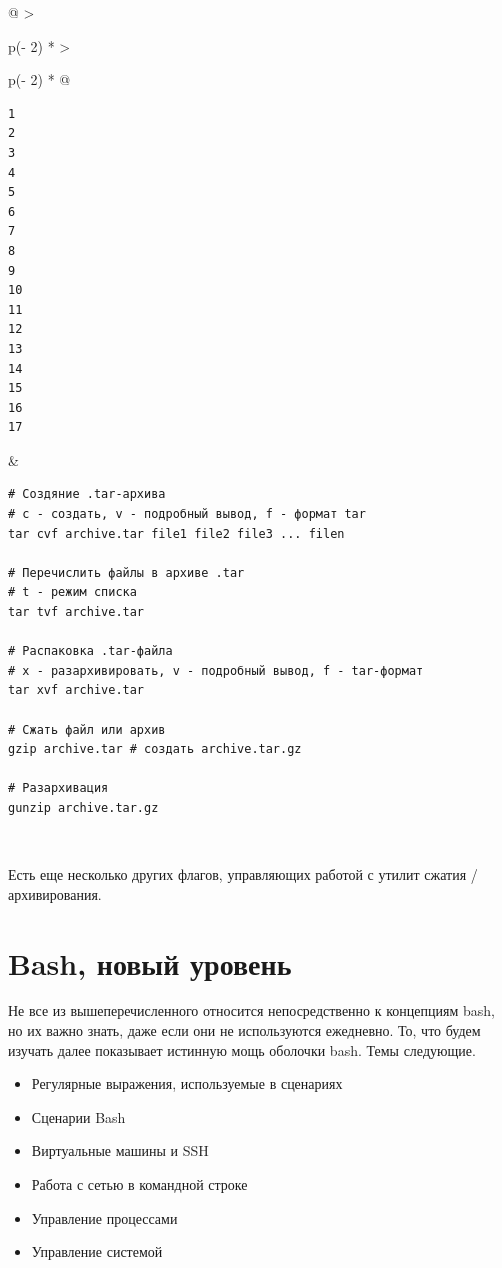 \documentclass{report}
\begin{document}
\begin{longtable}[]{@{}
  >{\raggedright\arraybackslash}p{(\columnwidth - 2\tabcolsep) * }
  >{\raggedright\arraybackslash}p{(\columnwidth - 2\tabcolsep) * }@{}}
\toprule
\endhead
\begin{minipage}[t]{\linewidth}\raggedright
\begin{verbatim}
1
2
3
4
5
6
7
8
9
10
11
12
13
14
15
16
17
\end{verbatim}
\end{minipage} & \begin{minipage}[t]{\linewidth}\raggedright
\begin{verbatim}
# Создяние .tar-архива
# c - создать, v - подробный вывод, f - формат tar
tar cvf archive.tar file1 file2 file3 ... filen

# Перечислить файлы в архиве .tar
# t - режим списка
tar tvf archive.tar

# Распаковка .tar-файла
# x - разархивировать, v - подробный вывод, f - tar-формат
tar xvf archive.tar

# Сжать файл или архив
gzip archive.tar # создать archive.tar.gz

# Разархивация
gunzip archive.tar.gz
\end{verbatim}
\end{minipage} \\ \addlinespace
\bottomrule
\end{longtable}

Есть еще несколько других флагов, управляющих работой с утилит сжатия /
архивирования.

\hypertarget{Advanced-Bash}{%
\section{\texorpdfstring{\protect\hyperlink{Advanced-Bash}{}Bash, новый
уровень}{Bash, новый уровень}}\label{Advanced-Bash}}

Не все из вышеперечисленного относится непосредственно к концепциям
bash, но их важно знать, даже если они не используются ежедневно. То,
что будем изучать далее показывает истинную мощь оболочки bash. Темы
следующие.

\begin{itemize}
\tightlist
\item
  Регулярные выражения, используемые в сценариях
\item
  Сценарии Bash
\item
  Виртуальные машины и SSH
\item
  Работа с сетью в командной строке
\item
  Управление процессами
\item
  Управление системой
\end{itemize}
\end{document}
